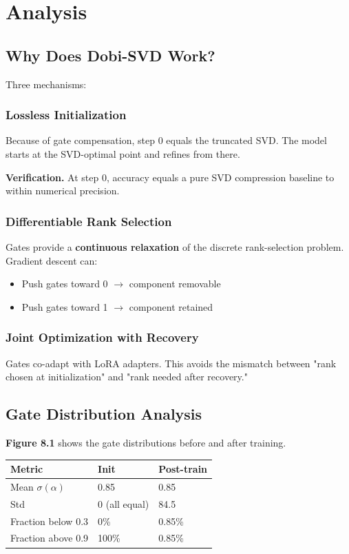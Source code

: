 
\section{Analysis}

\subsection{Why Does Dobi-SVD Work?}

Three mechanisms:

\subsubsection{Lossless Initialization}

Because of gate compensation, step 0 equals the truncated SVD. The model 
starts at the SVD-optimal point and refines from there.

\textbf{Verification.} At step 0, accuracy equals a pure SVD compression baseline 
to within numerical precision.

\subsubsection{Differentiable Rank Selection}

Gates provide a \textbf{continuous relaxation} of the discrete rank-selection 
problem. Gradient descent can:
\begin{itemize}
\item Push gates toward 0 $\to$ component removable
\item Push gates toward 1 $\to$ component retained

\end{itemize}
\subsubsection{Joint Optimization with Recovery}

Gates co-adapt with LoRA adapters. This avoids the mismatch between 
"rank chosen at initialization" and "rank needed after recovery."

\subsection{Gate Distribution Analysis}

\textbf{Figure 8.1} shows the gate distributions before and after training.

\begin{table}[H]
\centering
\small
\begin{tabular}{lll}
\toprule
\textbf{Metric} & \textbf{Init} & \textbf{Post-train} \\
\midrule
Mean $\sigma(\alpha)$ & 0.85 & 0.85 \\
Std & 0 (all equal) & 84.5 \\
Fraction below 0.3 & 0\% & 0.85\% \\
Fraction above 0.9 & 100\% & 0.85\% \\
\bottomrule
\end{tabular}
\end{table}

